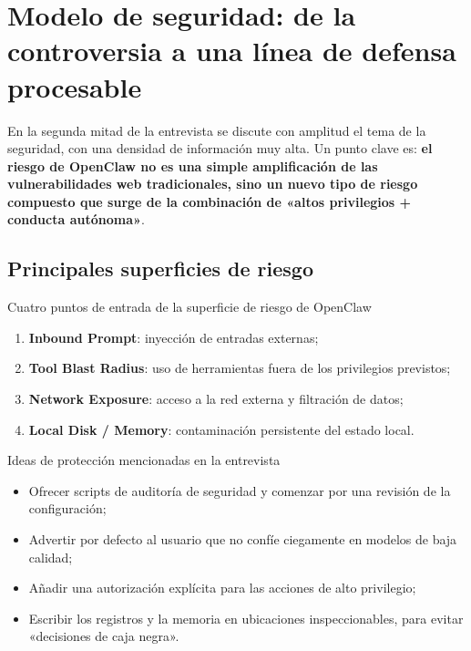 \section{Modelo de seguridad: de la controversia a una línea de defensa procesable}

En la segunda mitad de la entrevista se discute con amplitud el tema de la seguridad, con una densidad de información muy alta. Un punto clave es: \textbf{el riesgo de OpenClaw no es una simple amplificación de las vulnerabilidades web tradicionales, sino un nuevo tipo de riesgo compuesto que surge de la combinación de «altos privilegios + conducta autónoma»}.

\subsection{Principales superficies de riesgo}

\begin{warningbox}{Cuatro puntos de entrada de la superficie de riesgo de OpenClaw}
\begin{enumerate}
    \item \textbf{Inbound Prompt}: inyección de entradas externas;
    \item \textbf{Tool Blast Radius}: uso de herramientas fuera de los privilegios previstos;
    \item \textbf{Network Exposure}: acceso a la red externa y filtración de datos;
    \item \textbf{Local Disk / Memory}: contaminación persistente del estado local.
\end{enumerate}
\end{warningbox}

\begin{importantbox}{Ideas de protección mencionadas en la entrevista}
\begin{itemize}
    \item Ofrecer scripts de auditoría de seguridad y comenzar por una revisión de la configuración;
    \item Advertir por defecto al usuario que no confíe ciegamente en modelos de baja calidad;
    \item Añadir una autorización explícita para las acciones de alto privilegio;
    \item Escribir los registros y la memoria en ubicaciones inspeccionables, para evitar «decisiones de caja negra».
\end{itemize}
\end{importantbox}

